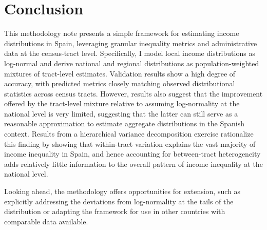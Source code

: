 \documentclass[letterpaper,11pt,leqno]{article}
\begin{document}


\section{Conclusion}\label{sec:conc}

This methodology note presents a simple framework for estimating income distributions in Spain, leveraging granular inequality metrics and administrative data at the census-tract level. Specifically, I model local income distributions as log-normal and derive national and regional distributions as population-weighted mixtures of tract-level estimates. Validation results show a high degree of accuracy, with predicted metrics closely matching observed distributional statistics across census tracts. However, results also suggest that the improvement offered by the tract-level mixture relative to assuming log-normality at the national level is very limited, suggesting that the latter can still serve as a reasonable approximation to estimate aggregate distributions in the Spanish context. Results from a hierarchical variance decomposition exercise rationalize this finding by showing that within-tract variation explains the vast majority of income inequality in Spain, and hence accounting for between-tract heterogeneity adds relatively little information to the overall pattern of income inequality at the national level.

Looking ahead, the methodology offers opportunities for extension, such as explicitly addressing the deviations from log-normality at the tails of the distribution or adapting the framework for use in other countries with comparable data available. 

\newpage
\singlespacing


\end{document}
